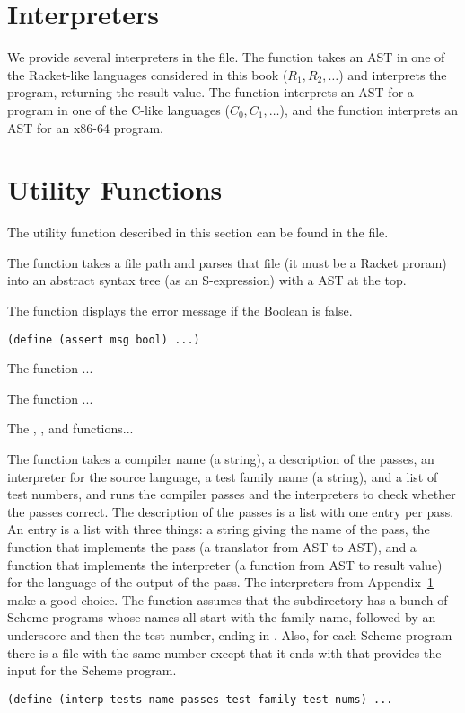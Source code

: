 \documentclass[11pt]{book}
\begin{document}
\section{Interpreters}
\label{appendix:interp}

We provide several interpreters in the  file.  The
 function takes an AST in one of the Racket-like
languages considered in this book ($R_1, R_2, \ldots$) and interprets
the program, returning the result value.  The  function
interprets an AST for a program in one of the C-like languages ($C_0,
C_1, \ldots$), and the  function interprets an AST
for an x86-64 program.

\section{Utility Functions}
\label{appendix:utilities}

The utility function described in this section can be found in the
 file.

The  function takes a file path and parses that file
(it must be a Racket proram) into an abstract syntax tree (as an
S-expression) with a  AST at the top.

The  function displays the error message  if the
Boolean  is false.
\begin{lstlisting}
(define (assert msg bool) ...)
\end{lstlisting}

The  function ...

The  function ...

The , , and 
functions...

The  function takes a compiler name (a string), a
description of the passes, an interpreter for the source language, a
test family name (a string), and a list of test numbers, and runs the
compiler passes and the interpreters to check whether the passes
correct. The description of the passes is a list with one entry per
pass.  An entry is a list with three things: a string giving the name
of the pass, the function that implements the pass (a translator from
AST to AST), and a function that implements the interpreter (a
function from AST to result value) for the language of the output of
the pass.  The interpreters from Appendix~\ref{appendix:interp} make a
good choice.  The  function assumes that the
subdirectory  has a bunch of Scheme programs whose names
all start with the family name, followed by an underscore and then the
test number, ending in . Also, for each Scheme program there
is a file with the same number except that it ends with  that
provides the input for the Scheme program.
\begin{lstlisting}
(define (interp-tests name passes test-family test-nums) ...
\end{lstlisting}
\end{document}
